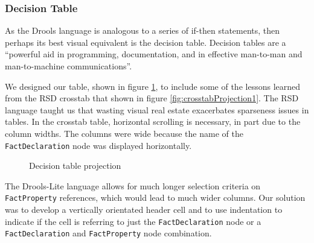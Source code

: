 \subsubsection{Decision Table}

As the Drools language is analogous to a series of if-then statements, then perhaps its best visual equivalent is the decision table.
Decision tables are a ``powerful aid in programming, documentation, and in effective man-to-man and man-to-machine communications''\cite{pooch1974translation}.

We designed our table, shown in figure \ref{fig:decisionTableProjection}, to include some of the lessons learned from the RSD crosstab that shown in figure \ref{fig:crosstabProjection1}.
The RSD language taught us that wasting visual real estate exacerbates sparseness issues in tables.
In the crosstab table, horizontal scrolling is necessary, in part due to the column widths.
The columns were wide because the name of the \texttt{FactDeclaration} node was displayed horizontally.

\begin{figure}[h]
    \centering
    \caption{Decision table projection}
    \label{fig:decisionTableProjection}
\end{figure}

The Drools-Lite language allows for much longer selection criteria on \texttt{FactProperty} references, which would lead to much wider columns.
Our solution was to develop a vertically orientated header cell and to use indentation to indicate if the cell is referring to just the \texttt{FactDeclaration} node or a \texttt{FactDeclaration} and \texttt{FactProperty} node combination.

